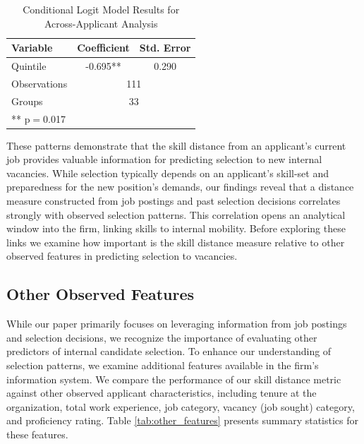 \begin{table}[h]
    \centering
    \caption{Conditional Logit Model Results for Across-Applicant Analysis}
    \renewcommand{\arraystretch}{1.2}
    \begin{tabular}{lcc}
    \hline
    \textbf{Variable} & \textbf{Coefficient} & \textbf{Std. Error} \\
    \hline
    Quintile & -0.695** & 0.290 \\
    \hline
    Observations & \multicolumn{2}{c}{111} \\
    Groups & \multicolumn{2}{c}{33} \\
    \hline
    \multicolumn{3}{l}{\footnotesize{** p$=$0.017}} \\
    \end{tabular}
    \label{tab:across_applicant}
\end{table}


These patterns demonstrate that the skill distance from an applicant's current job provides valuable information for predicting selection to new internal vacancies. While 
selection typically depends on an applicant's skill-set and preparedness for the new position's demands, our findings reveal that a distance measure constructed from job 
postings and past selection decisions correlates strongly with observed selection patterns. This correlation opens an analytical window into the firm, linking skills to 
internal mobility. Before exploring these links we examine how important is the skill distance measure relative to other observed features in predicting selection to vacancies.



\subsection{Other Observed Features}

While our paper primarily focuses on leveraging information from job postings and selection decisions, we recognize the importance of evaluating other predictors of 
internal candidate selection. To enhance our understanding of selection patterns, we examine additional features available in the firm's information system. We compare 
the performance of our skill distance metric against other observed applicant characteristics, including tenure at the organization, total work experience, job category, 
vacancy (job sought) category, and proficiency rating. Table \ref{tab:other_features} presents summary statistics for these features. 

